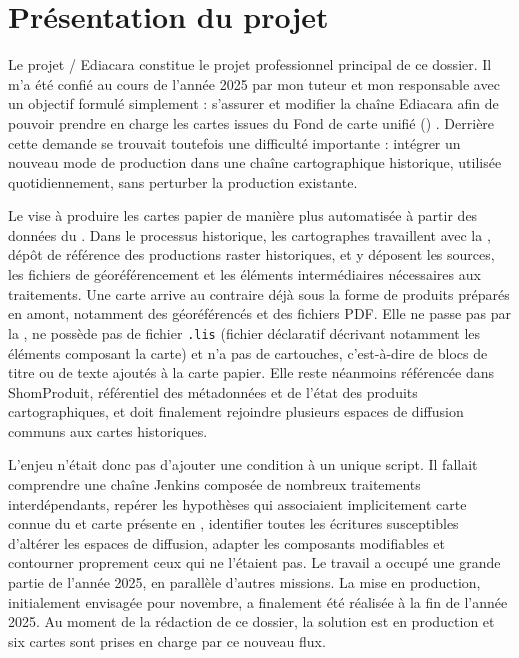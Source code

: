 \section{Présentation du projet}

Le projet  / Ediacara constitue le projet professionnel principal de ce dossier. Il m'a été confié au cours de l'année 2025 par mon tuteur et mon responsable avec un objectif formulé simplement : \og s'assurer et modifier la chaîne Ediacara afin de pouvoir prendre en charge les cartes issues du Fond de carte unifié () \fg. Derrière cette demande se trouvait toutefois une difficulté importante : intégrer un nouveau mode de production dans une chaîne cartographique historique, utilisée quotidiennement, sans perturber la production existante.

Le  vise à produire les cartes papier de manière plus automatisée à partir des données du . Dans le processus historique, les cartographes travaillent avec la , dépôt de référence des productions raster historiques, et y déposent les sources, les fichiers de géoréférencement et les éléments intermédiaires nécessaires aux traitements. Une carte  arrive au contraire déjà sous la forme de produits préparés en amont, notamment des  géoréférencés et des fichiers PDF. Elle ne passe pas par la , ne possède pas de fichier \texttt{.lis} (fichier déclaratif décrivant notamment les éléments composant la carte) et n'a pas de cartouches, c'est-à-dire de blocs de titre ou de texte ajoutés à la carte papier. Elle reste néanmoins référencée dans ShomProduit, référentiel des métadonnées et de l'état des produits cartographiques, et doit finalement rejoindre plusieurs espaces de diffusion communs aux cartes historiques.

L'enjeu n'était donc pas d'ajouter une condition à un unique script. Il fallait comprendre une chaîne Jenkins composée de nombreux traitements interdépendants, repérer les hypothèses qui associaient implicitement \og carte connue du  \fg et \og carte présente en  \fg, identifier toutes les écritures susceptibles d'altérer les espaces de diffusion, adapter les composants modifiables et contourner proprement ceux qui ne l'étaient pas. Le travail a occupé une grande partie de l'année 2025, en parallèle d'autres missions. La mise en production, initialement envisagée pour novembre, a finalement été réalisée à la fin de l'année 2025. Au moment de la rédaction de ce dossier, la solution est en production et six cartes  sont prises en charge par ce nouveau flux.

